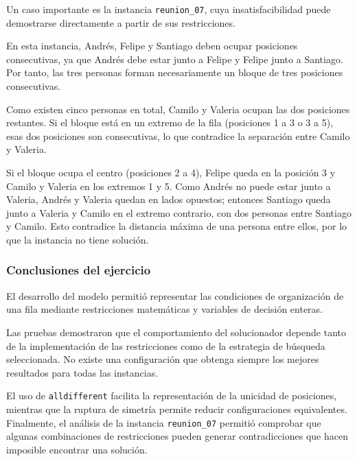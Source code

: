 Un caso importante es la instancia \texttt{reunion\_07}, cuya insatisfacibilidad puede demostrarse directamente a partir de sus restricciones.

En esta instancia, Andrés, Felipe y Santiago deben ocupar posiciones consecutivas, ya que Andrés debe estar junto a Felipe y Felipe junto a Santiago. Por tanto, las tres personas forman necesariamente un bloque de tres posiciones consecutivas.

Como existen cinco personas en total, Camilo y Valeria ocupan las dos posiciones restantes. Si el bloque está en un extremo de la fila (posiciones 1 a 3 o 3 a 5), esas dos posiciones son consecutivas, lo que contradice la separación entre Camilo y Valeria.

Si el bloque ocupa el centro (posiciones 2 a 4), Felipe queda en la posición 3 y Camilo y Valeria en los extremos 1 y 5. Como Andrés no puede estar junto a Valeria, Andrés y Valeria quedan en lados opuestos; entonces Santiago queda junto a Valeria y Camilo en el extremo contrario, con dos personas entre Santiago y Camilo. Esto contradice la distancia máxima de una persona entre ellos, por lo que la instancia no tiene solución.

\subsubsection{Conclusiones del ejercicio}

El desarrollo del modelo permitió representar las condiciones de organización de una fila mediante restricciones matemáticas y variables de decisión enteras.

Las pruebas demostraron que el comportamiento del solucionador depende tanto de la implementación de las restricciones como de la estrategia de búsqueda seleccionada. No existe una configuración que obtenga siempre los mejores resultados para todas las instancias.

El uso de \texttt{alldifferent} facilita la representación de la unicidad de posiciones, mientras que la ruptura de simetría permite reducir configuraciones equivalentes. Finalmente, el análisis de la instancia \texttt{reunion\_07} permitió comprobar que algunas combinaciones de restricciones pueden generar contradicciones que hacen imposible encontrar una solución.